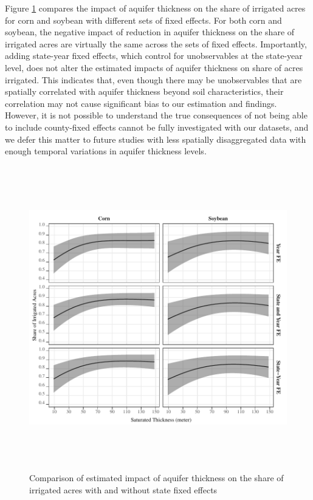 \documentclass[
]{article}
\begin{document}
Figure \ref{fig:state-fe-with-without} compares the impact of aquifer thickness on the share of irrigated acres for corn and soybean with different sets of fixed effects. For both corn and soybean, the negative impact of reduction in aquifer thickness on the share of irrigated acres are virtually the same across the sets of fixed effects. Importantly, adding state-year fixed effects, which control for unobservables at the state-year level, does not alter the estimated impacts of aquifer thickness on share of acres irrigated. This indicates that, even though there may be unobservables that are spatially correlated with aquifer thickness beyond soil characteristics, their correlation may not cause significant bias to our estimation and findings. However, it is not possible to understand the true consequences of not being able to include county-fixed effects cannot be fully investigated with our datasets, and we defer this matter to future studies with less spatially disaggregated data with enough temporal variations in aquifer thickness levels.

\begin{figure}[H]

{\centering \includegraphics[width=6in,height=500px,]{../../Figures/g_share_comp} 

}

\caption{Comparison of estimated impact of aquifer thickness on the share of irrigated acres with and without state fixed effects}\label{fig:state-fe-with-without}
\end{figure}
\end{document}
